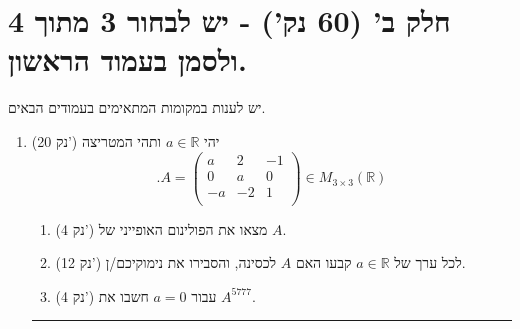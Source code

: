 \documentclass[12pt, a4paper]{article}
\newcommand{\rr}{\mathbb{R}}
\newcommand{\points}[1]{(#1 נק') }
\begin{document}
\section*{חלק ב' (60 נק') - יש לבחור 3 מתוך 4 ולסמן בעמוד הראשון.}
יש לענות במקומות המתאימים בעמודים הבאים.
\begin{enumerate}
\newcommand{\firstQ}{
\item\points{20}
יהי
$a\in\rr$
ותהי המטריצה
$$.A=
\begin{pmatrix}
a&2&-1\\
0&a&0\\
-a&-2&1\\
\end{pmatrix}\in
M_{3\times3}(\rr)$$
\begin{enumerate}
\item\points{4}
מצאו את הפולינום האופייני של
$A$.
\item
\points{12}
לכל ערך של
$a\in\rr$
קבעו האם 
$A$
לכסינה, והסבירו את נימוקיכם/ן.
\item\points{4}
עבור
$a=0$
חשבו את
$A^{5777}$.
\end{enumerate}

}
\firstQ
\noindent\rule{\textwidth-30pt}{0.4pt}


\end{enumerate}
\end{document}
